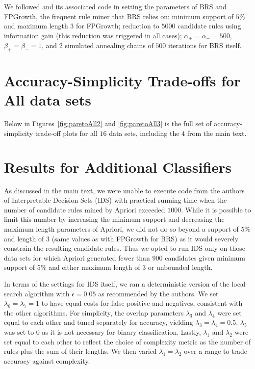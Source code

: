\documentclass[twoside,11pt]{article}
\begin{document}
We followed \citep{wang2017} and its associated code in setting the parameters of BRS and FPGrowth, the frequent rule miner that BRS relies on:  minimum support of $5\%$ and maximum length $3$ for FPGrowth; reduction to $5000$ candidate rules using information gain (this reduction was triggered in all cases); $\alpha_+ = \alpha_- = 500$, $\beta_+ = \beta_- = 1$, and $2$ simulated annealing chains of $500$ iterations for BRS itself.


\section{Accuracy-Simplicity Trade-offs for All data sets} \label{app:acc_simplicity_tradeoffs}

Below in Figures~\ref{fig:paretoAll2} and \ref{fig:paretoAll3} is the full set of accuracy-simplicity trade-off plots for all $16$ data sets, including the $4$ from the main text. 

\section{Results for Additional Classifiers} \label{app:additional_classifiers}

As discussed in the main text, we were unable to execute code from the authors of Interpretable Decision Sets (IDS) \citep{lakkaraju2016} with practical running time when the number of candidate rules mined by Apriori \citep{agrawal1994} exceeded $1000$.  While it is possible to limit this number by increasing the minimum support and decreasing the maximum length parameters of Apriori, we did not do so beyond a support of $5\%$ and length of $3$ (same values as with FPGrowth for BRS) as it would severely constrain the resulting candidate rules. Thus we opted to run IDS only on those data sets for which Apriori generated fewer than $900$ candidates given minimum support of $5\%$ and either maximum length of $3$ or unbounded length.  

In terms of the settings for IDS itself, we ran a deterministic version of the local search algorithm with $\epsilon = 0.05$ as recommended by the authors. We set $\lambda_6 = \lambda_7 = 1$ to have equal costs for false positive and negatives, consistent with the other algorithms. For simplicity, the overlap parameters $\lambda_3$ and $\lambda_4$ were set equal to each other and tuned separately for accuracy, yielding $\lambda_3 = \lambda_4 = 0.5$.  $\lambda_5$ was set to $0$ as it is not necessary for binary classification.  Lastly, $\lambda_1$ and $\lambda_2$ were set equal to each other to reflect the choice of complexity metric as the number of rules plus the sum of their lengths.  We then varied $\lambda_1 = \lambda_2$ over a range to trade accuracy against complexity.
\end{document}
